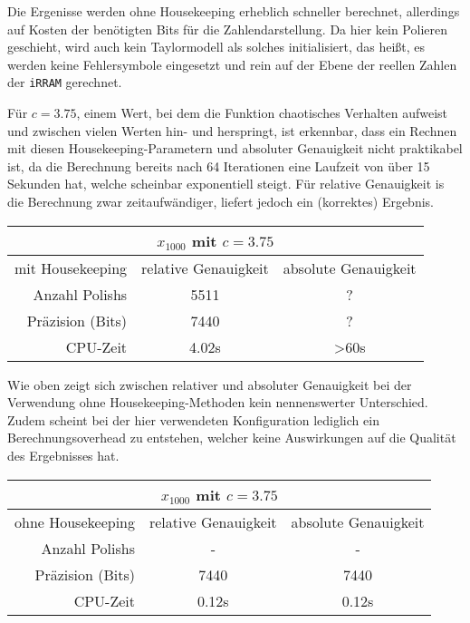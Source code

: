 Die Ergenisse werden ohne Housekeeping erheblich schneller berechnet, allerdings auf Kosten der benötigten Bits für die Zahlendarstellung. Da hier kein Polieren geschieht, wird auch kein Taylormodell als solches initialisiert, das heißt, es werden keine Fehlersymbole eingesetzt und rein auf der Ebene der reellen Zahlen der \verb+iRRAM+ gerechnet.

Für $c=3.75$, einem Wert, bei dem die Funktion chaotisches Verhalten aufweist und zwischen vielen Werten hin- und herspringt, ist erkennbar, dass ein Rechnen mit diesen Housekeeping-Parametern und absoluter Genauigkeit nicht praktikabel ist, da die Berechnung bereits nach 64 Iterationen eine Laufzeit von über 15 Sekunden hat, welche scheinbar exponentiell steigt. Für relative Genauigkeit is die Berechnung zwar zeitaufwändiger, liefert jedoch ein (korrektes) Ergebnis.

\begin{center}
\begin{tabular}{|r|c|c|}
\hline
\multicolumn{3}{|c|}{$x_{1000}$ mit $c=3.75$}\\
\hline
 mit Housekeeping &relative Genauigkeit & absolute Genauigkeit \\
 \hline
 \hline
 Anzahl Polishs & 5511 & ?\\
 Präzision (Bits) & 7440 & ?\\
 CPU-Zeit & 4.02s & >60s\\
 \hline
\end{tabular}
\end{center}

Wie oben zeigt sich zwischen relativer und absoluter Genauigkeit bei der Verwendung ohne Housekeeping-Methoden kein nennenswerter Unterschied. Zudem scheint bei der hier verwendeten Konfiguration lediglich ein Berechnungsoverhead zu entstehen, welcher keine Auswirkungen auf die Qualität des Ergebnisses hat.


\begin{center}
\begin{tabular}{|r|c|c|}
\hline
\multicolumn{3}{|c|}{$x_{1000}$ mit $c=3.75$}\\
\hline
 ohne Housekeeping &relative Genauigkeit & absolute Genauigkeit \\
 \hline
 \hline
 Anzahl Polishs & - & -\\
 Präzision (Bits) & 7440 & 7440\\
 CPU-Zeit & 0.12s & 0.12s\\
 \hline
\end{tabular}
\end{center}


